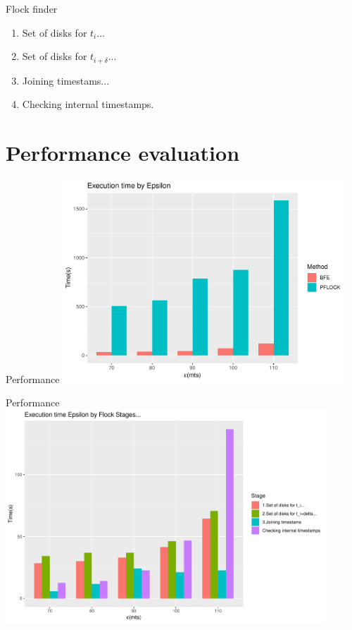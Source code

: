 \documentclass{beamer}
\theoremstyle{definition}
\begin{document}
\begin{frame}{Flock finder}
    \begin{enumerate}
        \item Set of disks for $t_i$...
        \item Set of disks for $t_{i+\delta}$...
        \item Joining timestams...
        \item Checking internal timestamps.
    \end{enumerate}
\end{frame}

\section{Performance evaluation}

\begin{frame}{Performance}
    \centering
    \includegraphics[width=0.8\textwidth]{BFEvsPFLOCK_ML}
\end{frame}

\begin{frame}{Performance}
    \centering
    \includegraphics[width=0.9\textwidth]{MergeLastFlocksByStage}
\end{frame}
\end{document}
